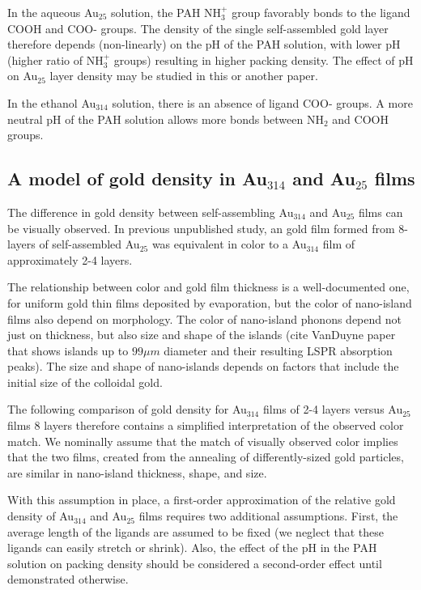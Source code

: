 \documentclass[12pt,oneside,english]{article}
\begin{document}
    In the aqueous Au$_{25}$ solution, the PAH NH$_3^+$ group favorably bonds to the ligand COOH and COO- groups.
    The density of the single self-assembled gold layer therefore depends (non-linearly) on the pH of the PAH solution, with lower pH (higher ratio of NH$_3^+$ groups) resulting in higher packing density.
    The effect of pH on Au$_{25}$ layer density may be studied in this or another paper.
    
    In the ethanol Au$_{314}$ solution, there is an absence of ligand COO- groups.
    A more neutral pH of the PAH solution allows more bonds between NH$_2$ and COOH groups.
    
    \subsection{A model of gold density in Au$_{314}$ and Au$_{25}$ films}
    The difference in gold density between self-assembling Au$_{314}$ and Au$_{25}$ films can be visually observed.
    In previous unpublished study, an gold film formed from 8-layers of self-assembled Au$_{25}$ was equivalent in color to a Au$_{314}$ film of approximately 2-4 layers.
    
    The relationship between color and gold film thickness is a well-documented one, for uniform gold thin films deposited by evaporation, but the color of nano-island films also depend on morphology.
    The color of nano-island phonons depend not just on thickness, but also size and shape of the islands \cite{link99} (cite VanDuyne paper that shows islands up to $99{\mu}m$ diameter and their resulting LSPR absorption peaks).
    The size and shape of nano-islands depends on factors that include the initial size of the colloidal gold.
    
    The following comparison of gold density for Au$_{314}$ films of 2-4 layers versus Au$_{25}$ films 8 layers therefore contains a simplified interpretation of the observed color match.  
    We nominally assume that the match of visually observed color implies that the two films, created from the annealing of differently-sized gold particles, are similar in nano-island thickness, shape, and size.
    
    With this assumption in place, a first-order approximation of the relative gold density of Au$_{314}$ and Au$_{25}$ films requires two additional assumptions.
    First, the average length of the ligands are assumed to be fixed (we neglect that these ligands can easily stretch or shrink).
    Also, the effect of the pH in the PAH solution on packing density should be considered a second-order effect until demonstrated otherwise.    
    
\end{document}
